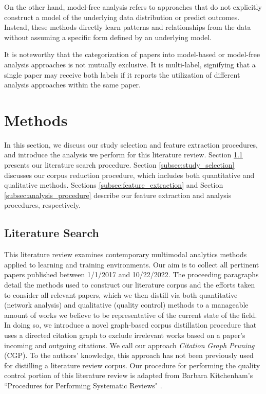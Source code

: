 \documentclass[manuscript,screen,review]{acmart}
\begin{document}
On the other hand, model-free analysis refers to approaches that do not explicitly construct a model of the underlying data distribution or predict outcomes. Instead, these methods directly learn patterns and relationships from the data without assuming a specific form defined by an underlying model. 

It is noteworthy that the categorization of papers into model-based or model-free analysis approaches is not mutually exclusive. It is multi-label, signifying that a single paper may receive both labels if it reports the utilization of different analysis approaches within the same paper. 

\section{Methods} \label{sec:methods}


In this section, we discuss our study selection and feature extraction procedures, and introduce the analysis we perform for this literature review. Section \ref{subsec:literature_search} presents our literature search procedure. Section \ref{subsec:study_selection} discusses our corpus reduction procedure, which includes both quantitative and qualitative methods. Sections \ref{subsec:feature_extraction} and Section \ref{subsec:analysis_procedure} describe our feature extraction and analysis procedures, respectively.

\subsection{Literature Search} \label{subsec:literature_search}

This literature review examines contemporary multimodal analytics methods applied to learning and training environments. Our aim is to collect all pertinent papers published between 1/1/2017 and 10/22/2022. The proceeding paragraphs detail the methods used to construct our literature corpus and the efforts taken to consider all relevant papers, which we then distill via both quantitative (network analysis) and qualitative (quality control) methods to a manageable amount of works we believe to be representative of the current state of the field. In doing so, we introduce a novel graph-based corpus distillation procedure that uses a directed citation graph to exclude irrelevant works based on a paper's incoming and outgoing citations. We call our approach \textit{Citation Graph Pruning} (CGP). To the authors' knowledge, this approach has not been previously used for distilling a literature review corpus. Our procedure for performing the quality control portion of this literature review is adapted from Barbara Kitchenham's ``Procedures for Performing Systematic Reviews" \cite{kitchenham2004procedures}.
\end{document}
